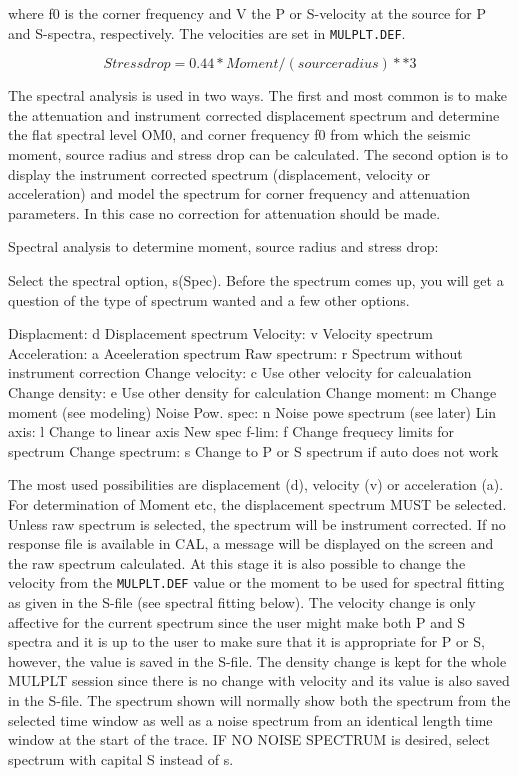 where f0 is the corner frequency and V the P or S-velocity at the source for P and S-spectra, respectively. The velocities are set in \texttt{MULPLT.DEF}. 

\begin{displaymath}
Stress drop = 0.44 * Moment /(source radius)**3
\end{displaymath}

 The spectral analysis is used in two ways. The first and most common is to make the attenuation and instrument corrected displacement spectrum and determine the flat spectral level OM0, and corner frequency f0 from which the seismic moment, source radius and stress drop can be calculated. The second option is to display the instrument corrected spectrum (displacement, velocity or acceleration) and model the spectrum for corner frequency and attenuation parameters. In this case no correction for attenuation should be made. 

Spectral analysis to determine moment, source radius and stress drop: 

Select the spectral option, s(Spec). Before the spectrum comes up, you will get a question of the type of spectrum wanted and a few other options.

Displacment:         d   Displacement spectrum
Velocity:            v   Velocity spectrum
Acceleration:        a   Aceeleration spectrum
Raw spectrum:        r   Spectrum without instrument correction
Change velocity:     c   Use other velocity for calcualation
Change density:      e   Use other density for calculation
Change moment:       m   Change moment (see modeling)
Noise Pow. spec:     n   Noise powe spectrum (see later)
Lin axis:            l   Change to linear axis
New spec f-lim:      f   Change frequecy limits for spectrum
Change spectrum:     s   Change to P or S spectrum if auto does not work

The most used possibilities are displacement (d), velocity (v) or acceleration (a). For determination of Moment etc, the displacement spectrum MUST be selected. Unless raw spectrum is selected, the spectrum will be instrument corrected. If no response file is available in CAL, a message will be displayed on the screen and the raw spectrum calculated. At this stage it is also possible to change the velocity from the \texttt{MULPLT.DEF} value or the moment to be used for spectral fitting as given in the S-file (see spectral fitting below). The velocity change is only affective for the current spectrum since the user might make both P and S spectra and it is up to the user to make sure that it is appropriate for P or S, however, the value is saved in the S-file. The density change is kept for the whole MULPLT session since there is no change with velocity and its value is also saved in the S-file. The spectrum shown will normally show both the spectrum from the selected time window as well as a noise spectrum from an identical length time window at the start of the trace. IF NO NOISE SPECTRUM is desired, select spectrum with capital S instead of s.   


